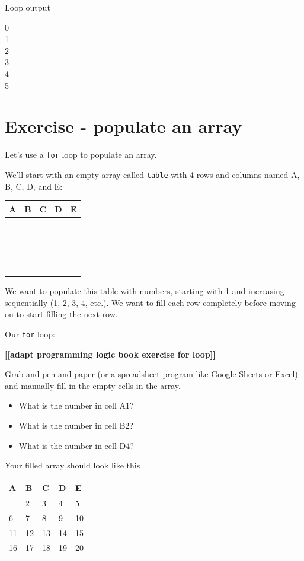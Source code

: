 \documentclass[
]{book}
\providecommand{\tightlist}{%
  \setlength{\itemsep}{0pt}\setlength{\parskip}{0pt}}
\begin{document}
Loop output

0\\
1\\
2\\
3\\
4\\
5\\

\hfill\break

\section{Exercise - populate an array}\label{exercise---populate-an-array}

Let's use a \texttt{for} loop to populate an array.

We'll start with an empty array called \texttt{table} with 4 rows and columns named A, B, C, D, and E:

\begin{longtable}[]{@{}lllll@{}}
\toprule\noalign{}
A & B & C & D & E \\
\midrule\noalign{}
\endhead
\bottomrule\noalign{}
\endlastfoot
~ & ~ & ~ & ~ & ~ \\
~ & ~ & ~ & ~ & ~ \\
~ & ~ & ~ & ~ & ~ \\
~ & ~ & ~ & ~ & ~ \\
\end{longtable}

We want to populate this table with numbers, starting with 1 and increasing sequentially (1, 2, 3, 4, etc.). We want to fill each row completely before moving on to start filling the next row.

Our \texttt{for} loop:

\textbf{{[}{[}adapt programming logic book exercise for loop{]}{]}}

Grab and pen and paper (or a spreadsheet program like Google Sheets or Excel) and manually fill in the empty cells in the array.

\begin{itemize}
\tightlist
\item
  What is the number in cell A1?
\item
  What is the number in cell B2?
\item
  What is the number in cell D4?
\end{itemize}

Your filled array should look like this

\begin{longtable}[]{@{}lllll@{}}
\toprule\noalign{}
A & B & C & D & E \\
\midrule\noalign{}
\endhead
\bottomrule\noalign{}
\endlastfoot
1 & 2 & 3 & 4 & 5 \\
6 & 7 & 8 & 9 & 10 \\
11 & 12 & 13 & 14 & 15 \\
16 & 17 & 18 & 19 & 20 \\
\end{longtable}
\end{document}
